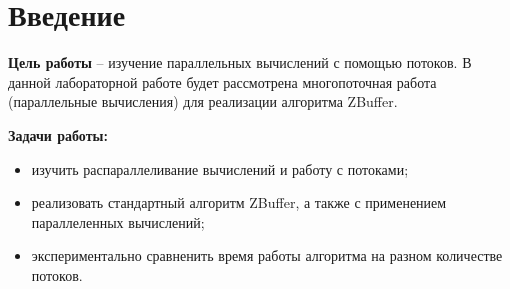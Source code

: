 \chapter*{Введение}
\textbf{Цель работы} – изучение параллельных вычислений с помощью потоков. В данной лабораторной работе будет рассмотрена многопоточная работа (параллельные вычисления) для реализации алгоритма ZBuffer.

\textbf{Задачи работы:}
\begin{itemize}
	\item изучить распараллеливание вычислений и работу с потоками;
	\item реализовать стандартный алгоритм ZBuffer, а также с применением параллеленных вычислений;
	\item экспериментально сравненить время работы алгоритма на разном количестве потоков.
\end{itemize}